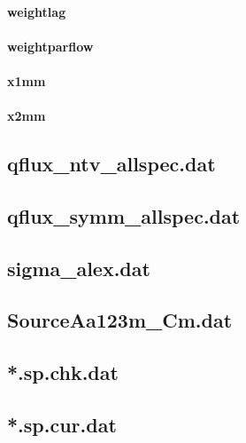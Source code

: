 \paragraph{weightlag}

\paragraph{weightparflow}

\paragraph{x1mm}

\paragraph{x2mm}

\subsection{qflux\_ntv\_allspec.dat}

\subsection{qflux\_symm\_allspec.dat}

\subsection{sigma\_alex.dat}

\subsection{SourceAa123m\_Cm.dat}

\subsection{*.sp.chk.dat}

\subsection{*.sp.cur.dat}

